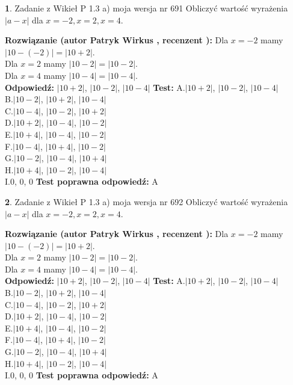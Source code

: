 \documentclass[12pt, a4paper]{article}
\theoremstyle{definition} %
\newtheorem{zad}{}
\newcommand{\zadStart}[1]{\begin{zad}#1\newline}
\newcommand{\zadStop}{\end{zad}}
\newcommand{\rozwStart}[2]{\noindent \textbf{Rozwiązanie (autor #1 , recenzent #2): }\newline}
\newcommand{\rozwStop}{\newline}
\newcommand{\odpStart}{\noindent \textbf{Odpowiedź:}\newline}
\newcommand{\odpStop}{\newline}
\newcommand{\testStart}{\noindent \textbf{Test:}\newline}
\newcommand{\testStop}{\newline}
\newcommand{\kluczStart}{\noindent \textbf{Test poprawna odpowiedź:}\newline}
\newcommand{\kluczStop}{\newline}
\begin{document}
\zadStart{Zadanie z Wikieł P 1.3 a) moja wersja nr 691}
Obliczyć wartość wyrażenia $|a - x|$ dla $x=-2,x=2,x=4$.
\zadStop
\rozwStart{Patryk Wirkus}{}
Dla $x = -2$ mamy $|10 - (-2)| = |10 + 2|$.\\
Dla $x = 2$ mamy $|10 - 2| = |10 - 2|$.\\
Dla $x = 4$ mamy $|10 - 4| = |10 - 4|$.\\
\rozwStop
\odpStart
$|10 + 2|$, $|10 - 2|$, $|10 - 4|$
\odpStop
\testStart
A.$|10 + 2|$, $|10 - 2|$, $|10 - 4|$\\
B.$|10 - 2|$, $|10 + 2|$, $|10 - 4|$\\
C.$|10 - 4|$, $|10 - 2|$, $|10 + 2|$\\
D.$|10 + 2|$, $|10 - 4|$, $|10 - 2|$\\
E.$|10 + 4|$, $|10 - 4|$, $|10 - 2|$\\
F.$|10 - 4|$, $|10 + 4|$, $|10 - 2|$\\
G.$|10 - 2|$, $|10 - 4|$, $|10 + 4|$\\
H.$|10 + 4|$, $|10 - 2|$, $|10 - 4|$\\
I.$0$, $0$, $0$
\testStop
\kluczStart
A
\kluczStop



\zadStart{Zadanie z Wikieł P 1.3 a) moja wersja nr 692}
Obliczyć wartość wyrażenia $|a - x|$ dla $x=-2,x=2,x=4$.
\zadStop
\rozwStart{Patryk Wirkus}{}
Dla $x = -2$ mamy $|10 - (-2)| = |10 + 2|$.\\
Dla $x = 2$ mamy $|10 - 2| = |10 - 2|$.\\
Dla $x = 4$ mamy $|10 - 4| = |10 - 4|$.\\
\rozwStop
\odpStart
$|10 + 2|$, $|10 - 2|$, $|10 - 4|$
\odpStop
\testStart
A.$|10 + 2|$, $|10 - 2|$, $|10 - 4|$\\
B.$|10 - 2|$, $|10 + 2|$, $|10 - 4|$\\
C.$|10 - 4|$, $|10 - 2|$, $|10 + 2|$\\
D.$|10 + 2|$, $|10 - 4|$, $|10 - 2|$\\
E.$|10 + 4|$, $|10 - 4|$, $|10 - 2|$\\
F.$|10 - 4|$, $|10 + 4|$, $|10 - 2|$\\
G.$|10 - 2|$, $|10 - 4|$, $|10 + 4|$\\
H.$|10 + 4|$, $|10 - 2|$, $|10 - 4|$\\
I.$0$, $0$, $0$
\testStop
\kluczStart
A
\kluczStop
\end{document}
